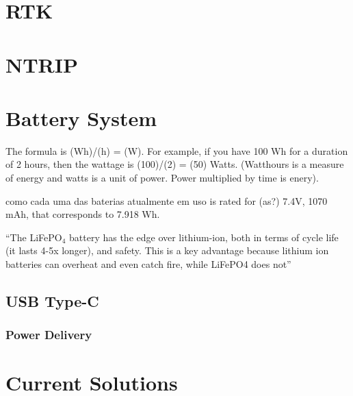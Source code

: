 \section{RTK}\label{II_rtk}

\section{NTRIP}\label{sec:II_ntrip}

\section{Battery System}\label{sec:II_battery}
The formula is (Wh)/(h) = (W). For example, if you have 100 Wh for a duration of 2 hours, then the wattage is (100)/(2) = (50) Watts.
(Watthours is a measure of energy and watts is a unit of power. Power multiplied by time is enery).

como cada uma das baterias atualmente em uso is rated for (as?) 7.4V, 1070 mAh, that corresponds to 7.918 Wh.

``The LiFePO$_4$ battery has the edge over lithium-ion, both in terms of cycle life (it lasts 4-5x longer), and safety. This is a key advantage because lithium ion batteries can overheat and even catch fire, while LiFePO4 does not''%

\subsection{USB Type-C}\label{sec:II_usb_c}
\subsubsection{Power Delivery}\label{sec:II_usb_c_PD}

\section{Current Solutions}\label{sec:II_curr_solutions}



